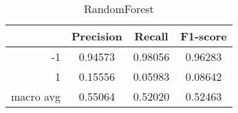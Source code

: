 \begin{table}[!h]
    \centering
    \renewcommand{\arraystretch}{1.5}
    \begin{tabular}{|r|c|c|c|}
        \hline
                  & Precision & Recall & F1-score \\ \hline
        -1        &     0.94573     &     0.98056   &    0.96283      \\ \hline
        1         &     0.15556      &     0.05983   &   0.08642       \\ \hline
        macro avg &      0.55064     &     0.52020   &    0.52463      \\ \hline
    \end{tabular}
    \caption{RandomForest}
\end{table}
